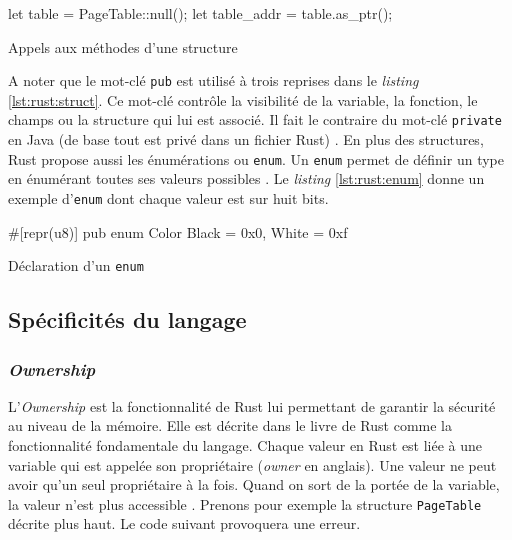 \begin{code}
\begin{rustcode}
let table = PageTable::null();
let table_addr = table.as_ptr();
\end{rustcode}
\caption{Appels aux méthodes d'une structure}
\label{lst:rust:struct:methods}
\end{code} \bigbreak

A noter que le mot-clé \texttt{pub} est utilisé à trois reprises dans
le \textit{listing} \ref{lst:rust:struct}. Ce mot-clé contrôle la visibilité de
la variable, la fonction, le champs ou la structure qui lui est associé. Il fait
le contraire du mot-clé \texttt{private} en Java (de base tout est privé
dans un fichier Rust) \cite{ref2}. En plus des structures, Rust propose aussi
les énumérations ou \texttt{enum}. Un \texttt{enum} permet
de définir un type en énumérant toutes ses valeurs possibles \cite{ref2}. Le
\textit{listing} \ref{lst:rust:enum} donne un exemple d'\texttt{enum}
dont chaque valeur est sur huit bits.

\begin{code}
\begin{rustcode}
#[repr(u8)]
pub enum Color {
    Black = 0x0,
    White = 0xf
}
\end{rustcode}
\caption{Déclaration d'un \texttt{enum}}
\label{lst:rust:enum}
\end{code} \bigbreak


\subsection{Spécificités du langage}
\subsubsection{\textit{Ownership}}
L'\textit{Ownership} est la fonctionnalité de Rust lui permettant de garantir la
sécurité au niveau de la mémoire. Elle est décrite dans le livre de Rust comme
la fonctionnalité fondamentale du langage. Chaque valeur en Rust est liée à une
variable qui est appelée son propriétaire (\textit{owner} en anglais). Une valeur
ne peut avoir qu'un seul propriétaire à la fois. Quand on sort de la portée de
la variable, la valeur n'est plus accessible \cite{ref2}. Prenons pour exemple
la structure \texttt{PageTable} décrite plus haut. Le code suivant
provoquera une erreur.

